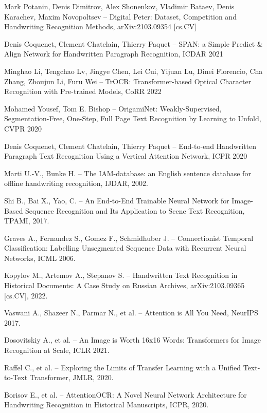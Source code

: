 \documentclass{extarticle}
\begin{document}
\begin{thebibliography}{00}
	Mark Potanin, Denis Dimitrov, Alex Shonenkov, Vladimir Bataev, Denis Karachev, Maxim Novopoltsev -- Digital Peter: Dataset, Competition and Handwriting Recognition Methods, arXiv:2103.09354 [cs.CV]
	
	Denis Coquenet, Clement Chatelain, Thierry Paquet -- SPAN: a Simple Predict \& Align Network for Handwritten Paragraph Recognition, ICDAR 2021
	
	Minghao Li, Tengchao Lv, Jingye Chen, Lei Cui, Yijuan Lu, Dinei Florencio, Cha Zhang, Zhoujun Li, Furu Wei -- TrOCR: Transformer-based Optical Character Recognition with Pre-trained Models, CoRR 2022
	
	Mohamed Yousef, Tom E. Bishop -- OrigamiNet: Weakly-Supervised, Segmentation-Free, One-Step, Full Page Text Recognition by Learning to Unfold, CVPR 2020
	
	Denis Coquenet, Clement Chatelain, Thierry Paquet -- End-to-end Handwritten Paragraph Text Recognition Using a Vertical Attention Network, ICPR 2020
	
	Marti U.-V., Bunke H. -- The IAM-database: an English sentence database for offline handwriting recognition, IJDAR, 2002.
	
	Shi B., Bai X., Yao, C. -- An End-to-End Trainable Neural Network for Image-Based Sequence Recognition and Its Application to Scene Text Recognition, TPAMI, 2017.
	
	Graves A., Fernandez S., Gomez F., Schmidhuber J. -- Connectionist Temporal Classification: Labelling Unsegmented Sequence Data with Recurrent Neural Networks, ICML 2006.
	
	Kopylov M., Artemov A., Stepanov S. -- Handwritten Text Recognition in Historical Documents: A Case Study on Russian Archives, arXiv:2103.09365 [cs.CV], 2022.
	
	Vaswani A., Shazeer N., Parmar N., et al. -- Attention is All You Need, NeurIPS 2017.
	
	Dosovitskiy A., et al. -- An Image is Worth 16x16 Words: Transformers for Image Recognition at Scale, ICLR 2021.
	
	Raffel C., et al. -- Exploring the Limits of Transfer Learning with a Unified Text-to-Text Transformer, JMLR, 2020.
	
	Borisov E., et al. -- AttentionOCR: A Novel Neural Network Architecture for Handwriting Recognition in Historical Manuscripts, ICPR, 2020.
	

\end{thebibliography}
\end{document}
